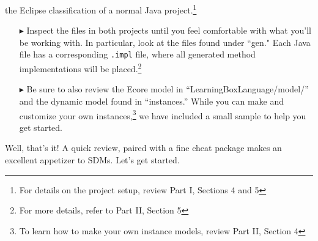 the Eclipse classification of a normal Java project.\footnote{For details on the project setup, review Part I, Sections 4 and 5} 

\begin{itemize}

\item[$\blacktriangleright$] Inspect the files in both projects until you feel comfortable with what you'll be working with. In particular, look at the files
found under ``gen." Each Java file has a corresponding \texttt{.impl} file, where all generated method implementations will be placed.\footnote{For
more details, refer to Part II, Section 5} 

\item[$\blacktriangleright$] Be sure to also review the Ecore model in ``LearningBoxLanguage/model/'' and the dynamic model found in ``instances.'' While
you can make and customize your own instances,\footnote{To learn how to make your own instance models, review Part II, Section 4} we have included a small
sample to help you get started.

\end{itemize}

Well, that's it! A quick review, paired with a fine cheat package makes an excellent appetizer to SDMs. Let's get started.